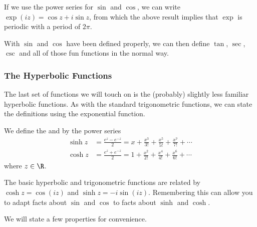 \begin{remark}
	If we use the power series for $\sin$ and $\cos$, we can write $\exp(iz) = \cos z + i \sin z$, from which the above result implies that $\exp$ is periodic with a period of $2\pi$.
\end{remark}

With $\sin$ and $\cos$ have been defined properly, we can then define $\tan$, $\sec$, $\csc$ and all of those fun functions in the normal way.

\subsubsection{The Hyperbolic Functions}

The last set of functions we will touch on is the (probably) slightly less familiar hyperbolic functions. As with the standard trigonometric functions, we can state the definitions using the exponential function.

\begin{definition}
	We define the  and  by the power series
	\begin{align*}
		\sinh z &= \frac{e^z - e^{-z}}{2} = x+\frac{x^{3}}{3 !}+\frac{x^{5}}{5 !}+\frac{x^{7}}{7 !}+\cdots \\
		\cosh z &= \frac{e^z + e^{-z}}{2} = 1+\frac{x^{2}}{2 !}+\frac{x^{4}}{4 !}+\frac{x^{6}}{6 !}+\cdots
	\end{align*}
	where $z \in \R$.
\end{definition}

\begin{remark}
	The basic hyperbolic and trigonometric functions are related by $\cosh z = \cos(iz)$ and $\sinh z = -i \sin (iz)$. Remembering this can allow you to adapt facts about $\sin$ and $\cos$ to facts about $\sinh$ and $\cosh$.
\end{remark}

We will state a few properties for convenience.

